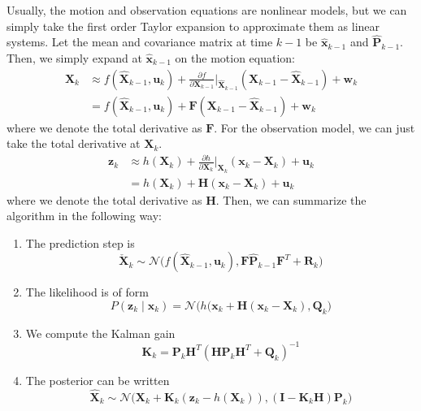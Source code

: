 \documentclass{article}
\newcounter{algo}[section]
\begin{document}
  Usually, the motion and observation equations are nonlinear models, but we can simply take the first order Taylor expansion to approximate them as linear systems. Let the mean and covariance matrix at time $k - 1$ be $\hat{\mathbf{x}}_{k-1}$ and $\hat{\mathbf{P}}_{k-1}$. Then, we simply expand at $\hat{\mathbf{x}}_{k-1}$ on the motion equation: 
  \begin{align*}
      \mathbf{X}_k & \approx f(\hat{\mathbf{X}}_{k-1}, \mathbf{u}_k) + \frac{\partial f}{\partial \mathbf{X}_{k-1}} \bigg|_{\hat{\mathbf{X}}_{k-1}} (\mathbf{X}_{k-1} - \hat{\mathbf{X}}_{k-1}) + \mathbf{w}_k \\
      & = f(\hat{\mathbf{X}}_{k-1}, \mathbf{u}_k) + \mathbf{F} (\mathbf{X}_{k-1} - \hat{\mathbf{X}}_{k-1}) + \mathbf{w}_k 
  \end{align*}
  where we denote the total derivative as $\mathbf{F}$. For the observation model, we can just take the total derivative at $\mathbf{X}_k$. 
  \begin{align*}
      \mathbf{z}_k & \approx h(\mathbf{X}_k) + \frac{\partial h}{\partial \mathbf{X}_k} \bigg|_{\mathbf{X}_k} (\mathbf{x}_k - \mathbf{X}_k) + \mathbf{u}_k \\
      & = h(\mathbf{X}_k) + \mathbf{H} (\mathbf{x}_k - \mathbf{X}_k) + \mathbf{u}_k 
  \end{align*}
  where we denote the total derivative as $\mathbf{H}$. Then, we can summarize the algorithm in the following way: 
  \begin{enumerate}
      \item The prediction step is 
      \begin{equation}
        \check{\mathbf{X}}_k \sim \mathcal{N}\big( f( \hat{\mathbf{X}}_{k-1}, \mathbf{u}_k), \mathbf{F} \hat{\mathbf{P}}_{k-1} \mathbf{F}^T + \mathbf{R}_k)
      \end{equation}
      \item The likelihood is of form 
      \begin{equation}
        P(\mathbf{z}_k \mid \mathbf{x}_k) = \mathcal{N}\big( h(\mathbf{x}_k + \mathbf{H}(\mathbf{x}_k - \mathbf{X}_k), \mathbf{Q}_k \big)
      \end{equation}
      \item We compute the Kalman gain 
      \begin{equation}
        \mathbf{K}_k = \mathbf{P}_k \mathbf{H}^T ( \mathbf{H} \mathbf{P}_k \mathbf{H}^T + \mathbf{Q}_k)^{-1}
      \end{equation}
      \item The posterior can be written 
      \begin{equation}
        \hat{\mathbf{X}}_k \sim \mathcal{N}\big( \mathbf{X}_k + \mathbf{K}_k (\mathbf{z}_k - h(\mathbf{X}_k)), (\mathbf{I} - \mathbf{K}_k \mathbf{H}) \mathbf{P}_k \big)
      \end{equation}
  \end{enumerate}
\end{document}
